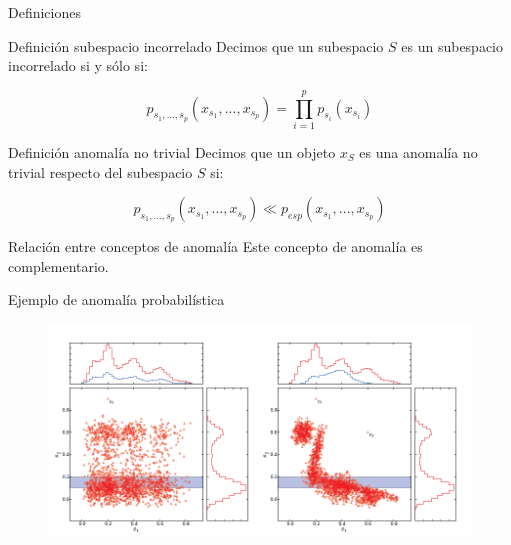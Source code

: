 \documentclass[10pt]{beamer}
\begin{document}
\begin{frame}[fragile]{Definiciones}
	\vspace{10px}
	\pause
	
	\begin{block}{Definición subespacio incorrelado}
		Decimos que un subespacio $S$ es un subespacio incorrelado si y sólo si:
		
		$$p_{s_1 , ... , s_p}(x_{s_1} , ... , {x_{s_p}}) = \prod_{i=1}^{p}p_{s_i}(x_{s_i})$$
	\end{block}
	
	\pause
	
	\begin{block}{Definición anomalía no trivial}
		Decimos que un objeto $x_S$ es una anomalía no trivial respecto del subespacio $S$ si:
		
		$$p_{s_1 , ... , s_p}(x_{s_1} , ... , x_{s_p})\ll p_{esp}(x_{s_1} , ... , x_{s_p})$$
	\end{block}
	
	\pause
	
	\begin{alertblock}{Relación entre conceptos de anomalía}
		Este concepto de anomalía es complementario.
	\end{alertblock}
	
\end{frame}

\begin{frame}[fragile]{Ejemplo de anomalía probabilística}
	\vspace{10px}
	\pause
	
	\begin{figure}
		\centering
		\includegraphics[scale=0.5]{Imagenes/ejemplo_anomalia_probabilidad}
	\end{figure}
	
\end{frame}
\end{document}
